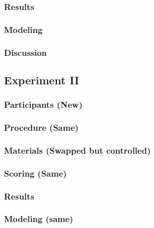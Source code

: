 \documentclass[]{book}
\theoremstyle{definition}
\theoremstyle{definition}
\theoremstyle{definition}
\theoremstyle{remark}
\begin{document}
\hypertarget{results-1}{%
\subsubsection{Results}\label{results-1}}

\hypertarget{modeling-1}{%
\subsubsection{Modeling}\label{modeling-1}}

\hypertarget{discussion-1}{%
\subsubsection{Discussion}\label{discussion-1}}

\hypertarget{experiment-ii}{%
\subsection{Experiment II}\label{experiment-ii}}

\hypertarget{participants-new}{%
\subsubsection{Participants (New)}\label{participants-new}}

\hypertarget{procedure-same}{%
\subsubsection{Procedure (Same)}\label{procedure-same}}

\hypertarget{materials-swapped-but-controlled}{%
\subsubsection{Materials (Swapped but
controlled)}\label{materials-swapped-but-controlled}}

\hypertarget{scoring-same}{%
\subsubsection{Scoring (Same)}\label{scoring-same}}

\hypertarget{results-2}{%
\subsubsection{Results}\label{results-2}}

\hypertarget{modeling-same}{%
\subsubsection{Modeling (same)}\label{modeling-same}}
\end{document}

